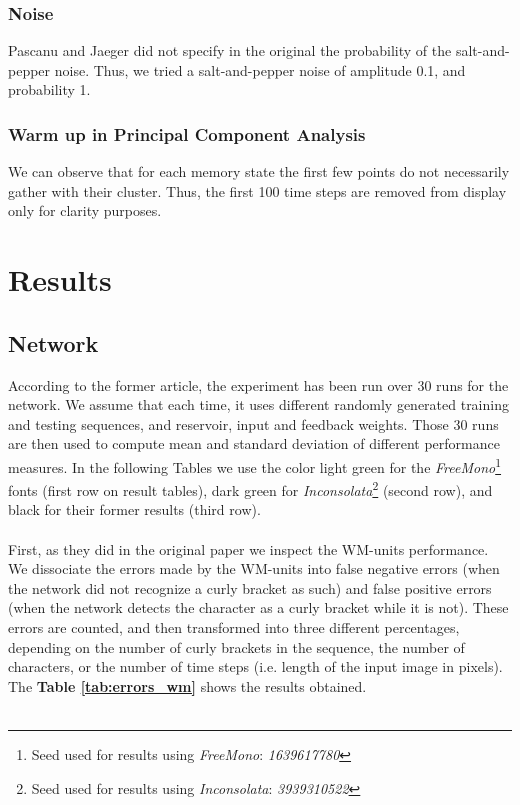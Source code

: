 \subsubsection{Noise}

Pascanu and Jaeger did not specify in the original the probability of the salt-and-pepper noise. Thus, we tried a salt-and-pepper noise of amplitude 0.1, and probability 1. \\

\subsubsection{Warm up in Principal Component Analysis}

We can observe that for each memory state the first few points do not necessarily gather with their cluster. Thus, the first 100 time steps are removed from display only for clarity purposes.

\section{Results}
\label{s:result}

\subsection{Network}
According to the former article, the experiment has been run over 30 runs for the network. 
We assume that each time, it uses different randomly generated training and testing sequences, and reservoir, input and feedback weights. Those 30 runs are then used to compute mean and standard deviation of different performance measures. In the following Tables we use the color light green for the \textit{FreeMono}\footnote{Seed used for results using \textit{FreeMono}: \textit{1639617780}} fonts (first row on result tables), dark green for \textit{Inconsolata}\footnote{Seed used for results using \textit{Inconsolata}: \textit{3939310522}} (second row), and black for their former results (third row). \\
\\
First, as they did in the original paper we inspect the WM-units performance.
We dissociate the errors made by the WM-units into false negative errors (when the network did not recognize a curly bracket as such) and false positive errors (when the network detects the character as a curly bracket while it is not).
These errors are counted, and then transformed into three different percentages, depending on the number of curly brackets in the sequence, the number of characters, or the number of time steps (i.e. length of the input image in pixels). The \textbf{Table \ref{tab:errors_wm}} shows the results obtained. \\
\\

